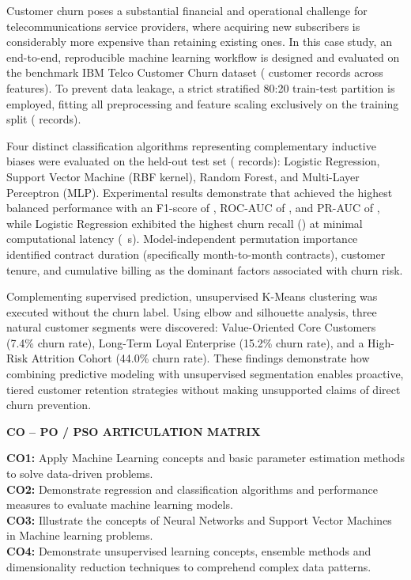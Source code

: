 \noindent Customer churn poses a substantial financial and operational challenge for telecommunications service providers, where acquiring new subscribers is considerably more expensive than retaining existing ones. In this case study, an end-to-end, reproducible machine learning workflow is designed and evaluated on the benchmark IBM Telco Customer Churn dataset (\datasetTotalRows{} customer records across \datasetTotalCols{} features). To prevent data leakage, a strict stratified 80:20 train-test partition is employed, fitting all preprocessing and feature scaling exclusively on the training split (\datasetTrainCount{} records). 

Four distinct classification algorithms representing complementary inductive biases were evaluated on the held-out test set (\datasetTestCount{} records): Logistic Regression, Support Vector Machine (RBF kernel), Random Forest, and Multi-Layer Perceptron (MLP). Experimental results demonstrate that \textbf{\bestModelName{}} achieved the highest balanced performance with an F1-score of \textbf{\bestModelFOne{}}, ROC-AUC of \textbf{\bestModelRocAuc{}}, and PR-AUC of \textbf{\bestModelPrAuc{}}, while Logistic Regression exhibited the highest churn recall (\LogisticRegressionRec{}) at minimal computational latency (\LogisticRegressionTime{}~s). Model-independent permutation importance identified contract duration (specifically month-to-month contracts), customer tenure, and cumulative billing as the dominant factors associated with churn risk. 

Complementing supervised prediction, unsupervised K-Means clustering was executed without the churn label. Using elbow and silhouette analysis, three natural customer segments were discovered: Value-Oriented Core Customers (7.4\% churn rate), Long-Term Loyal Enterprise (15.2\% churn rate), and a High-Risk Attrition Cohort (44.0\% churn rate). These findings demonstrate how combining predictive modeling with unsupervised segmentation enables proactive, tiered customer retention strategies without making unsupported claims of direct churn prevention.

\vspace{0.6cm}
\begin{center}
    {\bfseries\large CO -- PO / PSO ARTICULATION MATRIX\par}
\end{center}
\vspace{0.1cm}

\noindent \textbf{CO1:} Apply Machine Learning concepts and basic parameter estimation methods to solve data-driven problems.\\
\textbf{CO2:} Demonstrate regression and classification algorithms and performance measures to evaluate machine learning models.\\
\textbf{CO3:} Illustrate the concepts of Neural Networks and Support Vector Machines in Machine learning problems.\\
\textbf{CO4:} Demonstrate unsupervised learning concepts, ensemble methods and dimensionality reduction techniques to comprehend complex data patterns.

